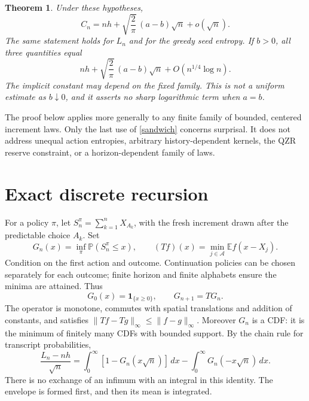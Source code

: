 \documentclass[10pt,a4paper]{article}
\newtheorem{theorem}{Theorem}
\newcommand{\E}{\mathbb E}
\newcommand{\Prb}{\mathbb P}
\begin{document}
\begin{theorem}\label{main}
Under these hypotheses,
\begin{equation}\label{asymptotic}
 \boxed{C_n=nh+\sqrt{\frac2\pi}\,(a-b)\sqrt n+o(\sqrt n).}
\end{equation}
The same statement holds for $L_n$ and for the greedy seed entropy. If $b>0$,
all three quantities equal
\begin{equation}\label{rate}
 nh+\sqrt{\frac2\pi}\,(a-b)\sqrt n+O(n^{1/4}\log n).
\end{equation}
The implicit constant may depend on the fixed family. This is not a uniform
estimate as $b\downarrow0$, and it asserts no sharp logarithmic term when $a=b$.
\end{theorem}

The proof below applies more generally to any finite family of bounded,
centered increment laws. Only the last use of \eqref{sandwich} concerns
surprisal. It does not address unequal action entropies, arbitrary
history-dependent kernels, the QZR reserve constraint, or a horizon-dependent
family of laws.

\section{Exact discrete recursion}
For a policy $\pi$, let $S_n^\pi=\sum_{k=1}^n X_{A_k}$, with the fresh
increment drawn after the predictable choice $A_k$. Set
\[
 G_n(x)=\inf_\pi\Prb(S_n^\pi\le x),\qquad
 (Tf)(x)=\min_{j\in\mathcal A}\E f(x-X_j).
\]
Condition on the first action and outcome. Continuation policies can be
chosen separately for each outcome; finite horizon and finite alphabets
ensure the minima are attained. Thus
\begin{equation}\label{bellman}
 G_0(x)=\mathbf1_{\{x\ge0\}},\qquad G_{n+1}=TG_n.
\end{equation}
The operator is monotone, commutes with spatial translations and addition
of constants, and satisfies $\|Tf-Tg\|_\infty\le\|f-g\|_\infty$.
Moreover $G_n$ is a CDF: it is the minimum of finitely many CDFs with bounded
support. By the chain rule for transcript probabilities,
\begin{equation}\label{meanidentity}
 \frac{L_n-nh}{\sqrt n}
 =\int_0^\infty[1-G_n(x\sqrt n)]\,dx
  -\int_0^\infty G_n(-x\sqrt n)\,dx.
\end{equation}
There is no exchange of an infimum with an integral in this identity.
The envelope is formed first, and then its mean is integrated.
\end{document}
